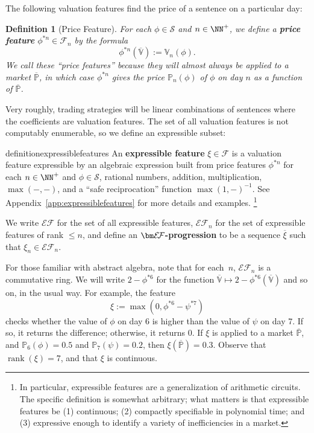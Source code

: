 \documentclass[authordate,onecolumn,noenvironments]{miri-tech-article}
\newtheorem{definition}[theorem]{Definition}
\numberwithin{equation}{subsection}
\newcommand{\seq}[1]{{\overline{#1}}}
\newcommand{\any}{-}
\newcommand{\exf}{\xi}
\newcommand{\rank}{\operatorname{rank}}
\newcommand{\nn}{n}
\newcommand{\MainTextOnly}[1]{#1}
\newcommand{\features}{\mathcal{F}} %
\newcommand{\exfeatures}{\mathcal{E\!F}} %
\newcommand{\iexfeatures}{\mathcal{IEF}}
\newcommand{\BelState}{\mathbb{P}}
\newcommand{\Valuation}{\mathbb{V}}
\newcommand{\Pricing}{\mathbb{P}}
\newcommand{\pf}[2][\nn]{{#2}^{*#1}}
\newcommand{\pt}{\BelState}
\newcommand{\MP}{\seq{\pt}}
\newcommand{\Sentences}{\mathcal{S}}
\begin{document}
\noindent The following valuation features find the price of a sentence on a particular day:

\begin{definition}[Price Feature]
  For each $\phi\in\Sentences$ and $\nn\in\NN^+$, we define a \textbf{price feature} $\phi^{*\nn} \in \features_\nn$ by the formula
  \[
    \pf{\phi}(\seq\Valuation) := \Valuation_\nn(\phi).
  \]
  We call these ``price features'' because they will almost always be applied to a market $\MP$, in which case $\pf{\phi}$ gives the price $\Pricing_n(\phi)$ of $\phi$ on day $\nn$ as a function of $\MP$.
\end{definition}

\noindent Very roughly, trading strategies will be linear combinations of sentences where the coefficients are valuation features. The set of all valuation features is not computably enumerable, so we define an expressible subset:

\begin{restatable}{definition}{expressiblefeatures}\label{def:tf}
  An \textbf{expressible feature} $\exf \in \features$ is a valuation feature expressible by an algebraic expression built from price features $\pf{\phi}$ for each $\nn\in\NN^+$ and $\phi\in\Sentences$, rational 
  numbers, addition, multiplication, $\max(\any, \any)$, and a ``safe reciprocation'' function $\max(1,\any)^{-1}$.  \MainTextOnly{See Appendix~\ref{app:expressiblefeatures} for more details and examples.  \footnote{In particular, expressible features are a generalization of arithmetic circuits.  The specific definition is somewhat arbitrary; what matters is that expressible features be (1) continuous; (2) compactly specifiable in polynomial time; 
and (3) expressive enough to identify a variety of inefficiencies in a market.}}
  
  We write $\exfeatures$ for the set of all expressible features, $\exfeatures_\nn$ for the set of expressible features of rank $\leq \nn$, and define an \textbf{$\bm\exfeatures$-progression} to be a sequence $\seq\exf$ such that $\exf_\nn\in\exfeatures_\nn$.
\end{restatable}

For those familiar with abstract algebra, note that for each~$\nn$, $\exfeatures_\nn$ is a commutative ring.  We will write $2 - \pf[6]{\phi}$ for the function $\seq{\Valuation} \mapsto 2 - \pf[6]{\phi}(\seq{\Valuation})$ and so on, in the usual way. For example, the feature
\[
  \exf := \max(0, \pf[6]{\phi} - \pf[7]{\psi})
\]
checks whether the value of $\phi$ on day 6 is higher than the value of $\psi$ on day 7. If so, it returns the difference; otherwise, it returns 0. If $\exf$ is applied to a market $\MP$, and $\pt_6(\phi)=0.5$ and $\pt_7(\psi)=0.2$, then $\exf(\MP)=0.3$. Observe that $\rank(\exf)=7$, and that $\exf$ is continuous.
\end{document}

